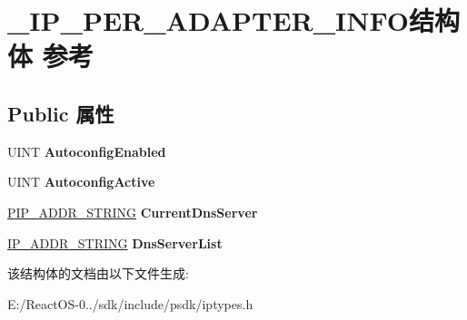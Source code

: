\hypertarget{struct___i_p___p_e_r___a_d_a_p_t_e_r___i_n_f_o}{}\section{\+\_\+\+I\+P\+\_\+\+P\+E\+R\+\_\+\+A\+D\+A\+P\+T\+E\+R\+\_\+\+I\+N\+F\+O结构体 参考}
\label{struct___i_p___p_e_r___a_d_a_p_t_e_r___i_n_f_o}
\subsection*{Public 属性}
\begin{DoxyCompactItemize}
\item 
\mbox{\label{struct___i_p___p_e_r___a_d_a_p_t_e_r___i_n_f_o_a847f8b40441a76e7c01068a7929e2c99}} 
U\+I\+NT {\bfseries Autoconfig\+Enabled}
\item 
\mbox{\label{struct___i_p___p_e_r___a_d_a_p_t_e_r___i_n_f_o_a9318237b9bb95ee0a43b09216a8c229f}} 
U\+I\+NT {\bfseries Autoconfig\+Active}
\item 
\mbox{\label{struct___i_p___p_e_r___a_d_a_p_t_e_r___i_n_f_o_ac880445a0d7942b6af5407bd7e52fa27}} 
\hyperlink{struct___i_p___a_d_d_r___s_t_r_i_n_g}{P\+I\+P\+\_\+\+A\+D\+D\+R\+\_\+\+S\+T\+R\+I\+NG} {\bfseries Current\+Dns\+Server}
\item 
\mbox{\label{struct___i_p___p_e_r___a_d_a_p_t_e_r___i_n_f_o_a0f35156832df36c7b348d19cd0116f62}} 
\hyperlink{struct___i_p___a_d_d_r___s_t_r_i_n_g}{I\+P\+\_\+\+A\+D\+D\+R\+\_\+\+S\+T\+R\+I\+NG} {\bfseries Dns\+Server\+List}
\end{DoxyCompactItemize}


该结构体的文档由以下文件生成\+:\begin{DoxyCompactItemize}
\item 
E\+:/\+React\+O\+S-\/0../sdk/include/psdk/iptypes.\+h\end{DoxyCompactItemize}
